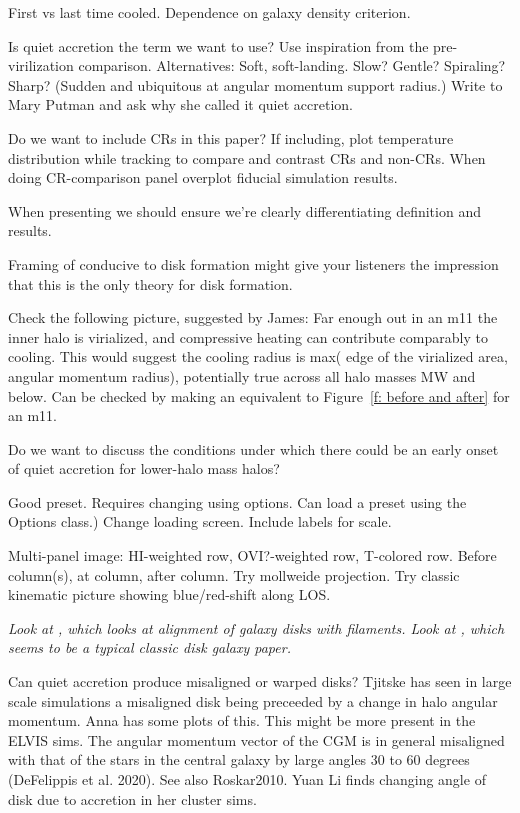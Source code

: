 \documentclass[fleqn,usenatbib]{mnras}
\begin{document}
First vs last time cooled.
Dependence on galaxy density criterion.

Is quiet accretion the term we want to use?
Use inspiration from the pre-virilization comparison.
Alternatives:
Soft, soft-landing.
Slow?
Gentle?
Spiraling?
Sharp? (Sudden and ubiquitous at angular momentum support radius.)
Write to Mary Putman and ask why she called it quiet accretion.

Do we want to include CRs in this paper?
If including, plot temperature distribution while tracking to compare and contrast CRs and non-CRs.
When doing CR-comparison panel overplot fiducial simulation results.

When presenting we should ensure we're clearly differentiating definition and results.

Framing of conducive to disk formation might give your listeners the impression that this is the only theory for disk formation.

Check the following picture, suggested by James:
Far enough out in an m11 the inner halo is virialized, and compressive heating can contribute comparably to cooling.
This would suggest the cooling radius is max( edge of the virialized area, angular momentum radius), potentially true across all halo masses MW and below.
Can be checked by making an equivalent to Figure~\ref{f: before and after} for an m11.


Do we want to discuss the conditions under which there could be an early onset of quiet accretion for lower-halo mass halos?

Good preset. Requires changing using options. Can load a preset using the Options class.)
Change loading screen.
Include labels for scale.

Multi-panel image:
HI-weighted row,
OVI?-weighted row,
T-colored row.
Before column(s), at column, after column.
Try mollweide projection.
Try classic kinematic picture showing blue/red-shift along LOS.

\textit{
    Look at \cite{Bird2019}, which looks at alignment of galaxy disks with filaments.
    Look at \cite{Bird2020}, which seems to be a typical classic disk galaxy paper.
}

Can quiet accretion produce misaligned or warped disks?
Tjitske has seen in large scale simulations a misaligned disk being preceeded by a change in halo angular momentum.
Anna has some plots of this. This might be more present in the ELVIS sims.
The angular momentum vector of the CGM is in general misaligned with that of the stars in the central galaxy by large angles  30 to 60 degrees (DeFelippis et al. 2020).
See also Roskar2010.
Yuan Li finds changing angle of disk due to accretion in her cluster sims.
\end{document}
